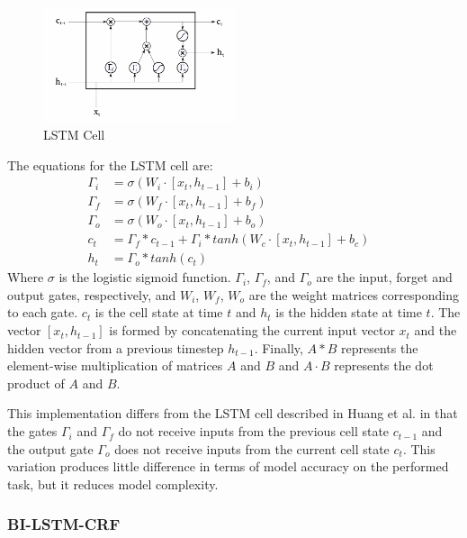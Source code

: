 \documentclass{nle}
\begin{document}
\begin{figure}[h]
  \centering
  \includegraphics[width=0.5\textwidth]{pics/lstm_cell}
  \caption{LSTM Cell}
  \label{fig:lstm_cell}
\end{figure}

The equations for the LSTM cell are:
%
\begin{align*}
\Gamma_{i} &= \sigma(W_i \cdot [x_t,h_{t-1}] + b_i) &\\
\Gamma_{f} &= \sigma(W_f \cdot [x_t,h_{t-1}] + b_f) &\\ 
\Gamma_{o} &= \sigma(W_o \cdot [x_{t},h_{t-1}] + b_o) &\\
c_t        &= \Gamma_{f} \ast c_{t-1} + \Gamma_{i} \ast tanh(W_c \cdot [x_{t},h_{t-1}] + b_c) &\\
h_t        &= \Gamma_{o} \ast tanh(c_t) &
\end{align*}
%
Where $ \sigma $ is the logistic sigmoid function. $ \Gamma_i $, $ \Gamma_f $, and $ \Gamma_o $ are the input,
forget and output gates, respectively, and $ W_i $, $ W_f $, $ W_o $ are the weight 
matrices corresponding to each gate. $ c_{t} $ is the cell 
state at time $ t $ and $ h_{t} $ is the hidden state at time $ t $. 
The vector $ [x_{t},h_{t-1}] $ is formed by concatenating the current input vector 
$ x_{t} $ and the hidden vector from a previous timestep $ h_{t-1} $. Finally,
$ A \ast B $ represents the element-wise multiplication of matrices $ A $ and $ B $
and $ A \cdot B $ represents the dot product of $ A $ and $ B $.

This implementation differs from the LSTM cell described in Huang et al. 
in that the gates $ \Gamma_i $ and $ \Gamma_f $ do not receive inputs from the previous 
cell state $ c_{t-1} $ and the output gate $ \Gamma_{o} $ does not receive inputs from the current cell 
state $ c_{t} $. This variation produces little difference in terms of model accuracy on
the performed task, but it reduces model complexity.

\subsubsection{BI-LSTM-CRF}
\label{sssec:lstm_crf}
\end{document}
